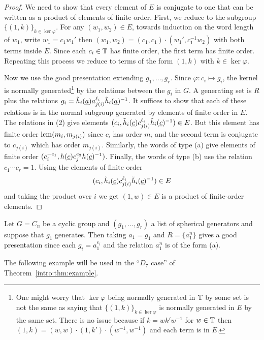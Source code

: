 \documentclass[main.tex]{subfiles}
\begin{document}
\begin{proof}
We need to show that every element of $E$ is conjugate to one that can be written as a product of elements of finite order. First, we reduce to the subgroup $\{(1, k) \}_{k \in \ker{\varphi}}$. For any $(w_1, w_2) \in E$, towards induction on the word length of $w_1$, write $w_1 
= c_1 w_1'$ then $(w_1, w_2) = (c_1, c_1) \cdot (w_1', c_1^{-1} w_2)$ with both terms inside $E$. Since each $c_i \in \mathbb{T}$ has finite order, the first term has finite order. Repeating this process we reduce to terms of the form $(1, k)$ with $k \in \ker{\varphi}$.
\par 
Now we use the good presentation extending $g_1, \dots, g_r$. Since $\varphi : c_i \mapsto g_i$, the kernel is normally generated\footnote{One might worry that $\ker{\varphi}$ being normally generated in $\mathbb{T}$ by some set is not the same as saying that $\{(1,k)\}_{k \in \ker{\varphi}}$ is normally generated in $E$ by the same set. There is no issue because if $k = w k' w^{-1}$ for $w \in \mathbb{T}$ then $(1, k) = (w, w) \cdot (1, k') \cdot (w^{-1}, w^{-1})$ and each term is in $E$.} by the relations between the $g_i$ in $G$. A generating set is $R$ plus the relations $g_i = \tilde{h}_i(\underline{a}) a_{j(i)}^{\ell_i} \tilde{h}_i(\underline{a})^{-1}$. It suffices to show that each of these relations is in the normal subgroup generated by elements of finite order in $E$. The relations in (2) give elements $(c_i, \tilde{h}_i(\underline{c}) c_{j(i)}^{\ell_i} \tilde{h}_i(\underline{c})^{-1}) \in E$. But this element has finite order $\operatorname{\mathrm{lcm}}(m_i, m_{j(i)})$ since $c_i$ has order $m_i$ and the second term is conjugate to $c_{j(i)}$ which has order $m_{j(i)}$. Similarly, the words of type (a) give elements of finite order $(c_i^{-e_1}, h(\underline{c}) c_j^{e_2} h(\underline{c})^{-1})$. Finally, the words of type (b) use the relation $c_1 \cdots c_r = 1$. Using the elements of finite order 
\[ (c_i, \tilde{h}_i(\underline{c}) c_{j(i)}^{\ell_i} \tilde{h}_i(\underline{c})^{-1}) \in E \] 
and taking the product over $i$ we get $(1, w) \in E$ is a product of finite-order elements. 
\end{proof}

\begin{example}
Let $G = C_n$ be a cyclic group and $(g_1, \dots, g_r)$ a list of spherical generators and suppose that $g_1$ generates. Then taking $a_1 = g_1$ and $R = \{ a_1^n \}$ gives a good presentation since each $g_i = a_1^{e_i}$ and the relation $a_1^n$ is of the form (a).    
\end{example}

The following example will be used in the ``$D_7$ case'' of Theorem~\ref{intro:thm:example}.
\end{document}
